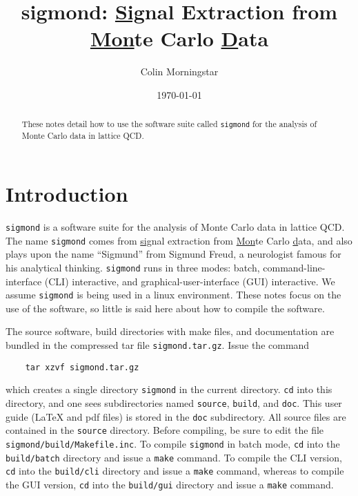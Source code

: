 \documentclass[12pt,notitlepage,letterpaper]{article}
\newcommand{\sigmond}{\texttt{sigmond} }
\newcommand{\vb}{\texttt}
\begin{document}
\title{\bf sigmond: \underline{Sig}nal Extraction from\\ 
\underline{Mon}te Carlo 
\underline{D}ata}
\author{Colin Morningstar}
\date{\today}
\maketitle
\begin{abstract}
These notes detail how to use the software suite called \sigmond for
the analysis of Monte Carlo data in lattice QCD.
\end{abstract}

\newpage

\tableofcontents

\newpage

\section{Introduction}

\sigmond is a software suite for the analysis of Monte Carlo data in 
lattice QCD.  The name \texttt{sigmond} comes from \underline{sig}nal 
extraction from \underline{Mon}te Carlo \underline{d}ata, and also plays 
upon the name ``Sigmund'' from Sigmund Freud, a neurologist famous for 
his analytical thinking.  \sigmond runs in three modes: batch, 
command-line-interface (CLI) interactive, and 
graphical-user-interface (GUI) interactive. We assume \sigmond is being used
in a linux environment.  These notes focus on the use of the software,
so little is said here about how to compile the software.

The source software, build directories with make files, and documentation
are bundled in the compressed tar file \vb{sigmond.tar.gz}.  Issue the
command
\begin{verbatim}
    tar xzvf sigmond.tar.gz
\end{verbatim}
which creates a single directory \vb{sigmond} in the current directory.
\vb{cd} into this directory, and one sees subdirectories named \vb{source}, 
\vb{build}, and \vb{doc}.  This user guide (LaTeX and pdf files)
is stored in the \vb{doc} subdirectory.  All source files are contained in 
the \vb{source} directory.   Before compiling, be sure to edit the file 
\vb{sigmond/build/Makefile.inc}.  To compile \vb{sigmond} in batch mode, 
\vb{cd} into the \vb{build/batch} directory and 
issue a \vb{make} command.  To compile the CLI version, \vb{cd} into the 
\vb{build/cli} directory and issue a \vb{make} command, whereas to compile
the GUI version, \vb{cd} into the \vb{build/gui} directory and 
issue a \vb{make} command.
\end{document}
